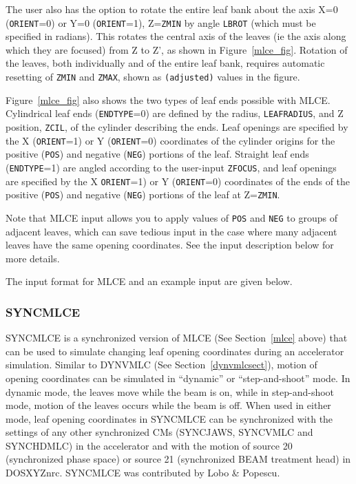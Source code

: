 \documentclass[12pt,twoside]{article}
\begin{document}
The user also has
the option to rotate the entire leaf bank about the axis
X=0 ({\tt ORIENT}=0) or Y=0 ({\tt ORIENT}=1), Z={\tt ZMIN} by angle
{\tt LBROT} (which must be specified in radians).  This rotates the
central axis of the leaves (ie the axis along which they are focused) from
Z to Z', as shown in Figure~\ref{mlce_fig}.  Rotation of the leaves,
both individually and of the entire leaf bank, requires automatic resetting
of {\tt ZMIN} and {\tt ZMAX}, shown as {\tt (adjusted)} values in the figure.

Figure~\ref{mlce_fig} also shows the two types of leaf ends possible with
MLCE.
Cylindrical leaf ends ({\tt ENDTYPE}=0) are defined by
the radius, {\tt LEAFRADIUS}, and Z position,
{\tt ZCIL}, of the cylinder describing the ends.
Leaf openings are specified by the
X ({\tt ORIENT}=1) or Y ({\tt ORIENT}=0)
coordinates of the cylinder origins for the positive
({\tt POS}) and negative ({\tt NEG}) portions of the leaf.
Straight leaf ends ({\tt ENDTYPE}=1) are angled according to
the user-input {\tt ZFOCUS}, and leaf openings are specified by the
X {\tt ORIENT}=1) or Y ({\tt ORIENT}=0)
coordinates of the ends of the positive ({\tt POS}) and
negative ({\tt NEG}) portions of the leaf at Z={\tt ZMIN}.

Note that MLCE input allows you to apply values of {\tt POS} and
{\tt NEG} to groups of adjacent leaves, which can save tedious input
in the case where many adjacent leaves have the same opening
coordinates.  See the input description below for more details.

The input format for MLCE and an example input are given below.
\begin{small}

\end{small}

\clearpage

\renewcommand{\rightmark}{SYNCMLCE CM}
\subsubsection{SYNCMLCE}

SYNCMLCE is a synchronized version of MLCE (See Section~\ref{mlce} above) that can be used to simulate
changing leaf opening coordinates during an accelerator simulation.  Similar to
DYNVMLC (See Section~\ref{dynvmlcsect}), motion of opening coordinates
can be simulated in ``dynamic'' or ``step-and-shoot'' mode.  In dynamic mode,
the leaves move while the beam is on, while in step-and-shoot mode, motion of
the leaves occurs while the beam is off.  When used in either mode, leaf
opening coordinates in SYNCMLCE can be synchronized with the settings of
any other synchronized CMs (SYNCJAWS, SYNCVMLC and SYNCHDMLC) in the accelerator
and with the motion of source 20 (synchronized phase space) or source 21
(synchronized BEAM treatment head) in DOSXYZnrc\cite{Wa05}.  SYNCMLCE was
contributed by Lobo \& Popescu\cite{LP10}.
\end{document}
